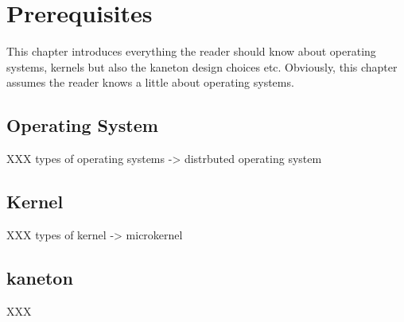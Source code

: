 %
%
%
%
%
%

%
%

\chapter{Prerequisites}
\label{chapter:prerequisites}

This chapter introduces everything the reader should know about operating
systems, kernels but also the kaneton design choices etc. Obviously,
this chapter assumes the reader knows a little about operating systems.

\newpage

%
%

%
%

\section{Operating System}

XXX types of operating systems -> distrbuted operating system

%
%

\section{Kernel}

XXX types of kernel -> microkernel

%
%

\section{kaneton}

XXX
